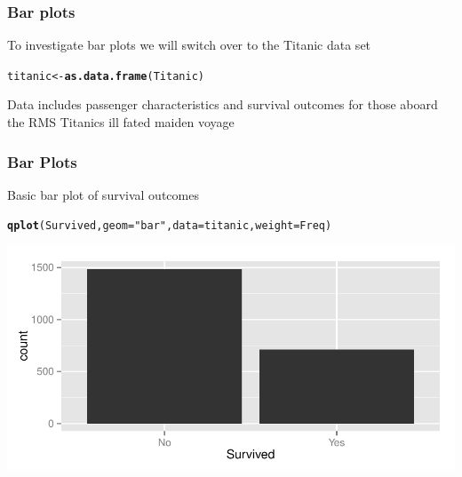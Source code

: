 \documentclass{beamer}\usepackage[]{graphicx}\usepackage[]{color}
\makeatletter
\newcommand{\hlstr}[1]{\textcolor[rgb]{0.192,0.494,0.8}{#1}}%
\newcommand{\hlstd}[1]{\textcolor[rgb]{0.345,0.345,0.345}{#1}}%
\newcommand{\hlkwb}[1]{\textcolor[rgb]{0.69,0.353,0.396}{#1}}%
\newcommand{\hlkwc}[1]{\textcolor[rgb]{0.333,0.667,0.333}{#1}}%
\newcommand{\hlkwd}[1]{\textcolor[rgb]{0.737,0.353,0.396}{\textbf{#1}}}%
\newenvironment{kframe}{%
 \def\at@end@of@kframe{}%
 \ifinner\ifhmode%
  \def\at@end@of@kframe{\end{minipage}}%
  \begin{minipage}{\columnwidth}%
 \fi\fi%
 \def\FrameCommand##1{\hskip\@totalleftmargin \hskip-\fboxsep
 \colorbox{shadecolor}{##1}\hskip-\fboxsep
     \hskip-\linewidth \hskip-\@totalleftmargin \hskip\columnwidth}%
 \MakeFramed {\advance\hsize-\width
   \@totalleftmargin\z@ \linewidth\hsize
   \@setminipage}}%
 {\par\unskip\endMakeFramed%
 \at@end@of@kframe}
\newenvironment{knitrout}{}{} %
\makeatother
\begin{document}

\begin{frame}
\frametitle{Bar plots}
    
To investigate bar plots we will switch over to the Titanic data set
\begin{knitrout}\footnotesize
{}\color{fgcolor}\begin{kframe}
\begin{alltt}
\hlstd{titanic} \hlkwb{<-} \hlkwd{as.data.frame}\hlstd{(Titanic)}
\end{alltt}
\end{kframe}
\end{knitrout}
\bigskip
    
Data includes passenger characteristics and survival outcomes for those aboard the RMS Titanics ill fated maiden voyage
    
\end{frame}


\begin{frame}[fragile]
\frametitle{Bar Plots}
    
Basic bar plot of survival outcomes
    
\footnotesize
\begin{knitrout}\footnotesize
{}\color{fgcolor}\begin{kframe}
\begin{alltt}
\hlkwd{qplot}\hlstd{(Survived,} \hlkwc{geom}\hlstd{=}\hlstr{"bar"}\hlstd{,} \hlkwc{data}\hlstd{=titanic,} \hlkwc{weight}\hlstd{=Freq)}
\end{alltt}
\end{kframe}

{\centering \includegraphics[width=.9\linewidth]{figure/kdiamondbar1} 

}



\end{knitrout}
\normalsize
\end{frame}
\end{document}
